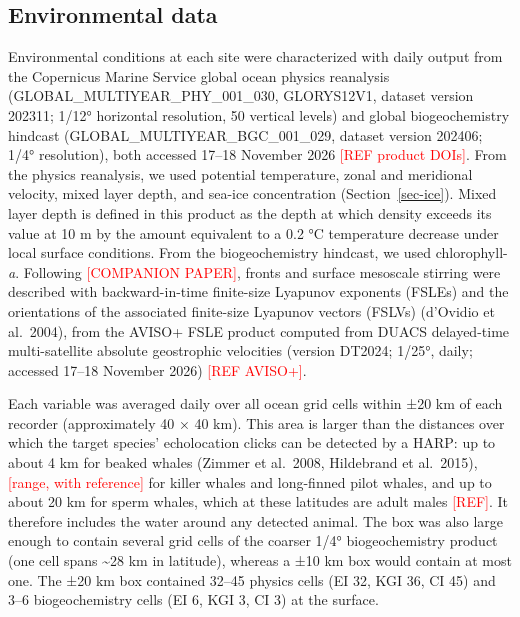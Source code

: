 \documentclass[
  11pt,
]{article}
\newcommand{\ins}[1]{\textcolor{red}{[#1]}}
\begin{document}
\subsection{Environmental data}\label{sec-env}

Environmental conditions at each site were characterized with daily
output from the Copernicus Marine Service global ocean physics
reanalysis (GLOBAL\_MULTIYEAR\_PHY\_001\_030, GLORYS12V1, dataset
version 202311; 1/12° horizontal resolution, 50 vertical levels) and
global biogeochemistry hindcast (GLOBAL\_MULTIYEAR\_BGC\_001\_029,
dataset version 202406; 1/4° resolution), both accessed 17--18 November
2026 \ins{REF product DOIs}. From the physics reanalysis, we used
potential temperature, zonal and meridional velocity, mixed layer depth,
and sea-ice concentration (Section~\ref{sec-ice}). Mixed layer depth is
defined in this product as the depth at which density exceeds its value
at 10 m by the amount equivalent to a 0.2 °C temperature decrease under
local surface conditions. From the biogeochemistry hindcast, we used
chlorophyll-\emph{a}. Following \ins{COMPANION PAPER}, fronts and
surface mesoscale stirring were described with backward-in-time
finite-size Lyapunov exponents (FSLEs) and the orientations of the
associated finite-size Lyapunov vectors (FSLVs) (d'Ovidio et al.~2004),
from the AVISO+ FSLE product computed from DUACS delayed-time
multi-satellite absolute geostrophic velocities (version DT2024; 1/25°,
daily; accessed 17--18 November 2026) \ins{REF AVISO+}.

Each variable was averaged daily over all ocean grid cells within ±20 km
of each recorder (approximately 40 × 40 km). This area is larger than
the distances over which the target species' echolocation clicks can be
detected by a HARP: up to about 4 km for beaked whales (Zimmer et
al.~2008, Hildebrand et al.~2015), \ins{range, with reference} for
killer whales and long-finned pilot whales, and up to about 20 km for
sperm whales, which at these latitudes are adult males \ins{REF}. It
therefore includes the water around any detected animal. The box was
also large enough to contain several grid cells of the coarser 1/4°
biogeochemistry product (one cell spans \textasciitilde28 km in
latitude), whereas a ±10 km box would contain at most one. The ±20 km
box contained 32--45 physics cells (EI 32, KGI 36, CI 45) and 3--6
biogeochemistry cells (EI 6, KGI 3, CI 3) at the surface.
\end{document}
